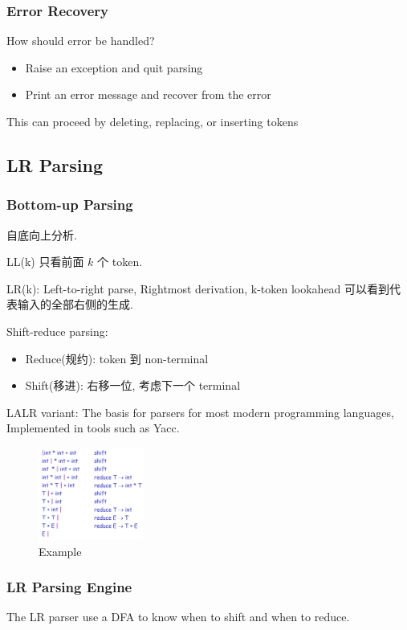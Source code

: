 \subsubsection{Error Recovery}
How should error be handled?
\begin{itemize}
    \item Raise an exception and quit parsing
    \item Print an error message and recover from the error
\end{itemize}
This can proceed by deleting, replacing, or inserting tokens

\subsection{LR Parsing}
\subsubsection{Bottom-up Parsing}
自底向上分析.

LL(k) 只看前面 $k$ 个 token.

LR(k): Left-to-right parse, Rightmost derivation, k-token lookahead 可以看到代表输入的全部右侧的生成.

Shift-reduce parsing:
\begin{itemize}
    \item Reduce(规约): token 到 non-terminal
    \item Shift(移进): 右移一位, 考虑下一个 terminal
\end{itemize}

LALR variant: The basis for parsers for most modern programming languages, Implemented in tools such as Yacc.

\begin{figure}[!htb]
    \centering
    \includegraphics[width=0.309\textwidth]{pic/CP3/lrexp.png}
    \caption{Example}
\end{figure}

\subsubsection{LR Parsing Engine}
The LR parser use a DFA to know when to shift and when to reduce.

